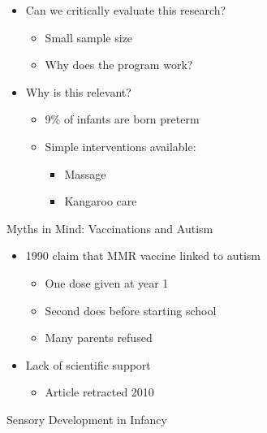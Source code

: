\documentclass[
]{book}
\providecommand{\tightlist}{%
  \setlength{\itemsep}{0pt}\setlength{\parskip}{0pt}}
\begin{document}
\begin{itemize}
\tightlist
\item
  Can we critically evaluate this research?

  \begin{itemize}
  \tightlist
  \item
    Small sample size
  \item
    Why does the program work?
  \end{itemize}
\item
  Why is this relevant?

  \begin{itemize}
  \tightlist
  \item
    9\% of infants are born preterm
  \item
    Simple interventions available:

    \begin{itemize}
    \tightlist
    \item
      Massage
    \item
      Kangaroo care
    \end{itemize}
  \end{itemize}
\end{itemize}

Myths in Mind: Vaccinations and Autism

\begin{itemize}
\tightlist
\item
  1990 claim that MMR vaccine linked to autism

  \begin{itemize}
  \tightlist
  \item
    One dose given at year 1
  \item
    Second does before starting school
  \item
    Many parents refused
  \end{itemize}
\item
  Lack of scientific support

  \begin{itemize}
  \tightlist
  \item
    Article retracted 2010
  \end{itemize}
\end{itemize}

Sensory Development in Infancy
\end{document}
